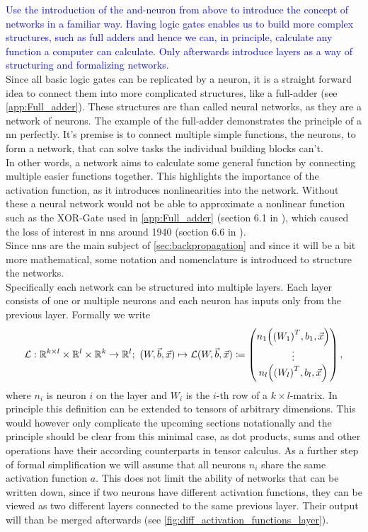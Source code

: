 \medskip
\textcolor{blue}{Use the introduction of the and-neuron from above to introduce the concept of networks in a familiar way. Having logic gates enables us to build more complex structures, such as full adders and hence we can, in principle, calculate any function a computer can calculate. Only afterwards introduce layers as a way of structuring and formalizing networks.}\\
\noindent Since all basic logic gates can be replicated by a neuron, it is a straight forward idea to connect them into more complicated structures, like a full-adder (see \autoref{app:Full_adder}). These structures are than called neural networks, as they are a network of neurons. The example of the full-adder demonstrates the principle of a \gls{nn} perfectly. It's premise is to connect multiple simple functions, the neurons, to form a network, that can solve tasks the individual building blocks can't.\\
In other words, a network aims to calculate some general function by connecting multiple easier functions together. This highlights the importance of the activation function, as it introduces nonlinearities into the network. Without these a neural network would not be able to approximate a nonlinear function such as the XOR-Gate used in \autoref{app:Full_adder} (section 6.1 in \cite{deep_learning_book}), which caused the loss of interest in \gls{nns} around 1940 (section 6.6 in \cite{deep_learning_book}).\medskip\\
Since \gls{nns} are the main subject of \autoref{sec:backpropagation} and since it will be a bit more mathematical, some notation and nomenclature is introduced to structure the networks.\\
Specifically each network can be structured into multiple layers. Each layer consists of one or multiple neurons and each neuron has inputs only from the previous layer. Formally we write
\begin{equation}
\mathcal{L}:\mathbb{R}^{k\times l}\times\mathbb{R}^l\times\mathbb{R}^k\to\mathbb{R}^l;\ (W, \vec{b}, \vec{x})\mapsto\mathcal{L}(W,\vec{b},\vec{x})\coloneqq
\begin{pmatrix}
n_1{\left( {(W_1)}^T,b_1,\vec{x} \right)}\\
\vdots\\
n_l{\left( {(W_l)}^T,b_l,\vec{x} \right)}
\end{pmatrix},
\end{equation}
where $n_i$ is neuron $i$ on the layer and $W_i$ is the $i$-th row of a $k\times l$-matrix. In principle this definition can be extended to tensors of arbitrary dimensions. This would however only complicate the upcoming sections notationally and the principle should be clear from this minimal case, as dot products, sums and other operations have their according counterparts in tensor calculus. As a further step of formal simplification we will assume that all neurons $n_i$ share the same activation function $a$. This does not limit the ability of networks that can be written down, since if two neurons have different activation functions, they can be viewed as two different layers connected to the same previous layer. Their output will than be merged afterwards (see \autoref{fig:diff_activation_functions_layer}).\\
